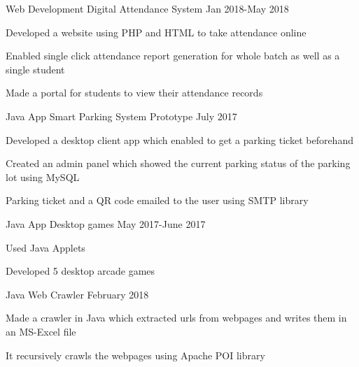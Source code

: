 \begin{cventries}
  \cventry
    {Web Development}
    {Digital Attendance System}
    {}
    {Jan 2018-May 2018}
    {
      \begin{cvitems}
        \item {Developed a website using PHP and HTML to take attendance online}
        \item {Enabled single click attendance report generation for whole batch as well as a single student }
        \item {Made a portal for students to view their attendance records}
      \end{cvitems}
    }
     \cventry
    {Java App}
    {Smart Parking System Prototype}
    {}
    {July 2017}
    {
      \begin{cvitems}
        \item {Developed a desktop client app which enabled to get a parking ticket beforehand}
        \item{Created an admin panel which showed the current parking status of the parking lot using MySQL}
        \item {Parking ticket and a QR code emailed to the user using SMTP library }
      \end{cvitems}
    }
    \cventry
    {Java App}
    {Desktop games}
    {}
    {May 2017-June 2017}
    {
      \begin{cvitems}
      \item {Used Java Applets}
        \item {Developed 5 desktop arcade games}
      \end{cvitems}
    }
    \cventry
    {Java}
    {Web Crawler}
    {}
    {February 2018}
    {
      \begin{cvitems}
        \item {Made a crawler in Java which extracted urls from webpages and writes them in an MS-Excel file}
        \item {It recursively crawls the webpages using Apache POI library}
      \end{cvitems}
    }
  
\end{cventries}
